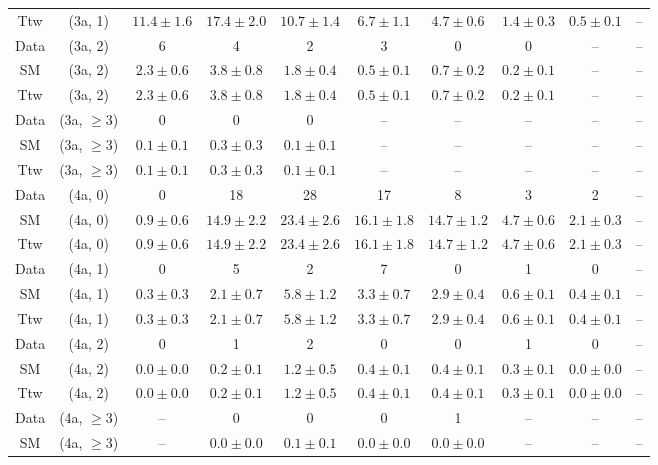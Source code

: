 \begin{table}[h!]
{\begin{tabular}{cccccccccc}
	Ttw & (3a, 1) & $11.4\pm 1.6$ & $17.4\pm 2.0$ & $10.7\pm 1.4$ & $6.7\pm 1.1$ & $4.7\pm 0.6$ & $1.4\pm 0.3$ & $0.5\pm 0.1$ & -- \\[0.5ex] 
	Data & (3a, 2) & 6 & 4 & 2 & 3 & 0 & 0 & -- & -- \\[0.5ex] 
	SM & (3a, 2) & $2.3\pm 0.6$ & $3.8\pm 0.8$ & $1.8\pm 0.4$ & $0.5\pm 0.1$ & $0.7\pm 0.2$ & $0.2\pm 0.1$ & -- & -- \\[0.5ex] 
	Ttw & (3a, 2) & $2.3\pm 0.6$ & $3.8\pm 0.8$ & $1.8\pm 0.4$ & $0.5\pm 0.1$ & $0.7\pm 0.2$ & $0.2\pm 0.1$ & -- & -- \\[0.5ex] 
	Data & (3a, $\ge3$) & 0 & 0 & 0 & -- & -- & -- & -- & -- \\[0.5ex] 
	SM & (3a, $\ge3$) & $0.1\pm 0.1$ & $0.3\pm 0.3$ & $0.1\pm 0.1$ & -- & -- & -- & -- & -- \\[0.5ex] 
	Ttw & (3a, $\ge3$) & $0.1\pm 0.1$ & $0.3\pm 0.3$ & $0.1\pm 0.1$ & -- & -- & -- & -- & -- \\[0.5ex] 
	Data & (4a, 0) & 0 & 18 & 28 & 17 & 8 & 3 & 2 & -- \\[0.5ex] 
	SM & (4a, 0) & $0.9\pm 0.6$ & $14.9\pm 2.2$ & $23.4\pm 2.6$ & $16.1\pm 1.8$ & $14.7\pm 1.2$ & $4.7\pm 0.6$ & $2.1\pm 0.3$ & -- \\[0.5ex] 
	Ttw & (4a, 0) & $0.9\pm 0.6$ & $14.9\pm 2.2$ & $23.4\pm 2.6$ & $16.1\pm 1.8$ & $14.7\pm 1.2$ & $4.7\pm 0.6$ & $2.1\pm 0.3$ & -- \\[0.5ex] 
	Data & (4a, 1) & 0 & 5 & 2 & 7 & 0 & 1 & 0 & -- \\[0.5ex] 
	SM & (4a, 1) & $0.3\pm 0.3$ & $2.1\pm 0.7$ & $5.8\pm 1.2$ & $3.3\pm 0.7$ & $2.9\pm 0.4$ & $0.6\pm 0.1$ & $0.4\pm 0.1$ & -- \\[0.5ex] 
	Ttw & (4a, 1) & $0.3\pm 0.3$ & $2.1\pm 0.7$ & $5.8\pm 1.2$ & $3.3\pm 0.7$ & $2.9\pm 0.4$ & $0.6\pm 0.1$ & $0.4\pm 0.1$ & -- \\[0.5ex] 
	Data & (4a, 2) & 0 & 1 & 2 & 0 & 0 & 1 & 0 & -- \\[0.5ex] 
	SM & (4a, 2) & $0.0\pm 0.0$ & $0.2\pm 0.1$ & $1.2\pm 0.5$ & $0.4\pm 0.1$ & $0.4\pm 0.1$ & $0.3\pm 0.1$ & $0.0\pm 0.0$ & -- \\[0.5ex] 
	Ttw & (4a, 2) & $0.0\pm 0.0$ & $0.2\pm 0.1$ & $1.2\pm 0.5$ & $0.4\pm 0.1$ & $0.4\pm 0.1$ & $0.3\pm 0.1$ & $0.0\pm 0.0$ & -- \\[0.5ex] 
	Data & (4a, $\ge3$) & -- & 0 & 0 & 0 & 1 & -- & -- & -- \\[0.5ex] 
	SM & (4a, $\ge3$) & -- & $0.0\pm 0.0$ & $0.1\pm 0.1$ & $0.0\pm 0.0$ & $0.0\pm 0.0$ & -- & -- & -- \\[0.5ex] 

\end{tabular}}
\end{table}
